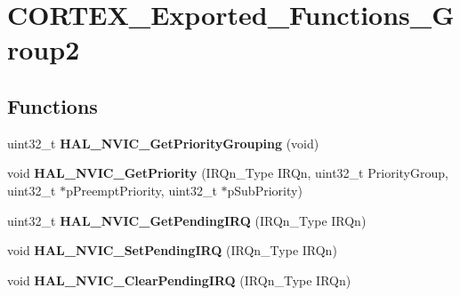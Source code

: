 \hypertarget{group___c_o_r_t_e_x___exported___functions___group2}{}\section{C\+O\+R\+T\+E\+X\+\_\+\+Exported\+\_\+\+Functions\+\_\+\+Group2}
\label{group___c_o_r_t_e_x___exported___functions___group2}
\subsection*{Functions}
\begin{DoxyCompactItemize}
\item 
\mbox{\label{group___c_o_r_t_e_x___exported___functions___group2_gaa02bc953fd4fce22248c491a93c4ce40}} 
uint32\+\_\+t {\bfseries H\+A\+L\+\_\+\+N\+V\+I\+C\+\_\+\+Get\+Priority\+Grouping} (void)
\item 
\mbox{\label{group___c_o_r_t_e_x___exported___functions___group2_ga6a21c9d904b0bcf4cb060f7c5c39b6f5}} 
void {\bfseries H\+A\+L\+\_\+\+N\+V\+I\+C\+\_\+\+Get\+Priority} (I\+R\+Qn\+\_\+\+Type I\+R\+Qn, uint32\+\_\+t Priority\+Group, uint32\+\_\+t $\ast$p\+Preempt\+Priority, uint32\+\_\+t $\ast$p\+Sub\+Priority)
\item 
\mbox{\label{group___c_o_r_t_e_x___exported___functions___group2_ga3bd5802a96f0dcbc00ac3b89b134da3b}} 
uint32\+\_\+t {\bfseries H\+A\+L\+\_\+\+N\+V\+I\+C\+\_\+\+Get\+Pending\+I\+RQ} (I\+R\+Qn\+\_\+\+Type I\+R\+Qn)
\item 
\mbox{\label{group___c_o_r_t_e_x___exported___functions___group2_gaecf50f6c6d0e1fa5f8bd8c1b45309f18}} 
void {\bfseries H\+A\+L\+\_\+\+N\+V\+I\+C\+\_\+\+Set\+Pending\+I\+RQ} (I\+R\+Qn\+\_\+\+Type I\+R\+Qn)
\item 
\mbox{\label{group___c_o_r_t_e_x___exported___functions___group2_ga0c7d007acf1339ca1bb46f3c6e018ff5}} 
void {\bfseries H\+A\+L\+\_\+\+N\+V\+I\+C\+\_\+\+Clear\+Pending\+I\+RQ} (I\+R\+Qn\+\_\+\+Type I\+R\+Qn)

\end{DoxyCompactItemize}
